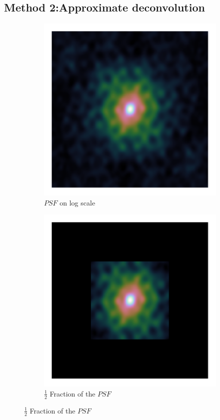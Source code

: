 \subsection{Method 2:Approximate deconvolution}
\begin{figure}[h]
	\centering
	\begin{subfigure}[b]{0.3\linewidth}
		\includegraphics[width=\linewidth, clip, trim= 0.25in 0.25in 0.25in 0.25in]{./chapters/03.cd/simulated/psf.png}
		\caption{$PSF$ on log scale}
	\end{subfigure}
	\begin{subfigure}[b]{0.3\linewidth}
		\includegraphics[width=\linewidth,clip, trim= 0.25in 0.25in 0.25in 0.25in]{./chapters/03.cd/simulated/psfCut.png}
		\caption{$\frac{1}{2}$ Fraction of the $PSF$}
	\end{subfigure}
	

\end{figure}
